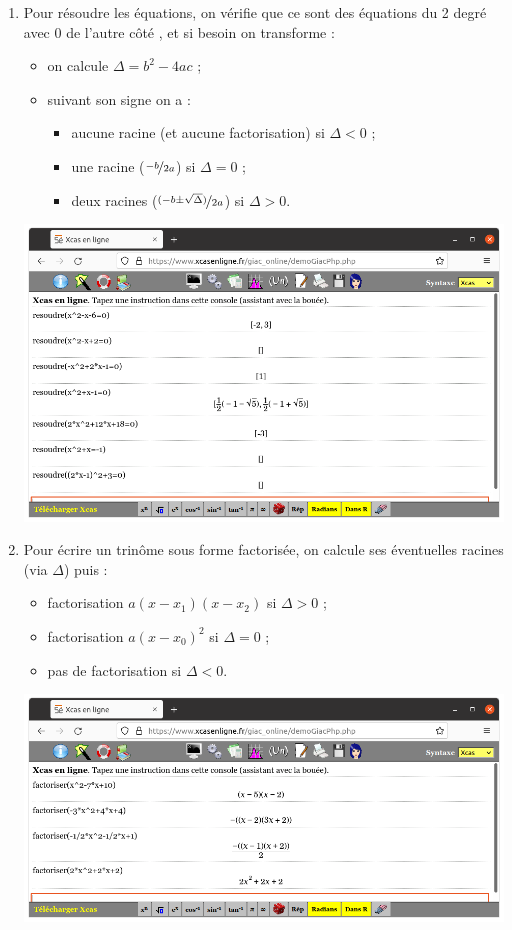 \documentclass[a4paper,11pt]{article}
\begin{document}
\begin{enumerate}
	\item Pour résoudre les équations, on vérifie que ce sont des équations du 2 degré \og avec 0 de l'autre côté \fg{}, et si besoin on \og transforme \fg{} :
	\begin{itemize}
		\item on calcule $\Delta=b^2-4ac$ ;
		\item suivant son signe on a :
		\begin{itemize}
			\item aucune racine (et aucune factorisation) si $\Delta < 0$ ;
			\item une racine ($\nicefrac{-b}{2a}$) si $\Delta=0$ ;
			\item deux racines ($\nicefrac{(-b\pm \sqrt{\Delta})}{2a}$) si $\Delta > 0$.
		\end{itemize}
	\end{itemize}
	\begin{center}
		\includegraphics[scale=0.3]{chap01_exos_corr_b}
	\end{center}
	\item Pour écrire un trinôme sous forme factorisée, on calcule ses éventuelles racines (via $\Delta$) puis :
	\begin{itemize}
		\item factorisation $a(x-x_1)(x-x_2)$ si $\Delta>0$ ;
		\item factorisation $a(x-x_0)^2$ si $\Delta=0$ ;
		\item pas de factorisation si $\Delta<0$.
	\end{itemize}
	\begin{center}
		\includegraphics[scale=0.3]{chap01_exos_corr_c}

\end{center}
\end{enumerate}
\end{document}
